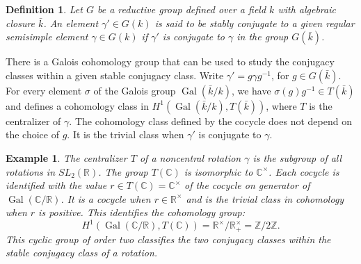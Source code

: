 \documentclass[brochure,english,12pt]{bourbaki}
\newtheorem{example}[equation]{Example}
\newtheorem{definition}[equation]{Definition}
\def\op#1{{\operatorname{#1}}}
\newcommand{\ring}[1]{\mathbb{#1}}
\begin{document}
\begin{definition} Let $G$ be a reductive group defined over a field
  $k$ with algebraic closure $\bar k$.  An element
  $\gamma'\in G(k)$ is said to be {\it stably conjugate} to a given regular
  semisimple element $\gamma\in G(k)$ if $\gamma'$ is conjugate to $\gamma$ in
  the group $G(\bar k)$.
\end{definition}


There is a Galois cohomology group that can be used to study the conjugacy classes within
a given stable conjugacy class.
Write $\gamma'=g\gamma g^{-1}$, for $g\in G(\bar k)$.
For every element $\sigma$ of the Galois group $\op{Gal}(\bar k/k)$,  we have
 $\sigma(g)g^{-1}\in T(\bar k)$ and defines a cohomology class in
$H^1(\op{Gal}(\bar k/k),T(\bar k))$, where $T$ is the centralizer of
$\gamma$.  The cohomology class defined by the cocycle does not depend
on the choice of $g$.  It is the trivial class when
$\gamma'$ is conjugate to $\gamma$.


\begin{example} The centralizer $T$ of a noncentral rotation $\gamma$ is  the subgroup of all
rotations in  $SL_2(\ring{R})$.  The group $T(\ring{C})$ is isomorphic
  to $\ring{C}^\times$.   Each cocycle is identified with the value $r\in T(\ring{C})=\ring{C}^\times$ 
   of the cocycle on generator of  $\op{Gal}(\ring{C}/\ring{R})$.  It is a cocycle when $r\in \ring{R}^\times$
  and is the trivial class in cohomology when $r$ is positive.  This identifies the cohomology group:
\[
H^1(\op{Gal}(\ring{C}/\ring{R}),T(\ring{C})) = \ring{R}^\times/\ring{R}^\times_+ = \ring{Z}/2\ring{Z}.
\]
 This cyclic group of order two classifies the two conjugacy classes within the stable conjugacy class
 of a rotation.
\end{example}
\end{document}
